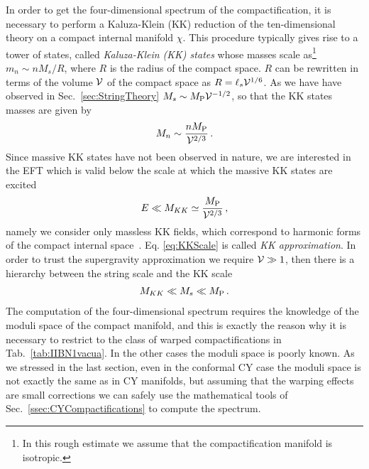 \documentclass[12pt,a4paper]{book}
\newcommand{\V}{{\cal{V}}}
\begin{document}
In order to get the four-dimensional spectrum of the compactification, it is necessary to perform a Kaluza-Klein (KK) reduction of the ten-dimensional theory on a compact internal manifold $\chi$. This procedure typically gives rise to a tower of states, called \textit{Kaluza-Klein (KK) states} whose masses scale as\footnote{In this rough estimate we assume that the compactification manifold is isotropic.} $m_n \sim n M_s/R$, where $R$ is the radius of the compact space. $R$ can be rewritten in terms of the volume $\V$ of the compact space as $R = \ell_s \V^{1/6}$. As we have have observed in Sec.~\ref{sec:StringTheory} $M_s \sim M_{\rm P} \V^{-1/2}$, so that the KK states masses are given by
\begin{align}
\label{eq:KKTower}
M_n \sim \frac{n M_{\rm P}}{\V^{2/3}}\,.
\end{align}
Since massive KK states have not been observed in nature, we are interested in the EFT which is valid below the scale at which the massive KK states are excited 
\begin{align}
\label{eq:KKScale}
E \ll M_{KK} \simeq \frac{M_{\rm P}}{\V^{2/3}}\,,
\end{align}
namely we consider only massless KK fields, which correspond to harmonic forms of the compact internal space~\cite{Candelas:1990pi}. Eq. \eqref{eq:KKScale} is called \textit{KK approximation}. In order to trust the supergravity approximation we require $\V \gg 1$, then there is a hierarchy between the string scale and the KK scale
\begin{align}
\label{eq:HierarchyMsMKK}
M_{KK} \ll M_s \ll M_{\rm P}\,.
\end{align}
The computation of the four-dimensional spectrum requires the knowledge of the moduli space of the compact manifold, and this is exactly the reason why it is necessary to restrict to the class of warped compactifications in Tab.~\ref{tab:IIBN1vacua}. In the other cases the moduli space is poorly known. As we stressed in the last section, even in the conformal CY case the moduli space is not exactly the same as in CY manifolds, but assuming that the warping effects are small corrections we can safely use the mathematical tools of Sec.~\ref{ssec:CYCompactifications} to compute the spectrum.\\
\end{document}
